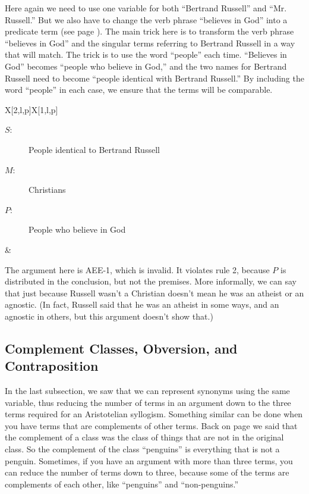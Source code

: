 Here again we need to use one variable for both ``Bertrand Russell'' and ``Mr. Russell.'' But we also have to change the verb phrase ``believes in God'' into a predicate term (see page \pageref{subsec:nonstandard_verbs}). The main trick here is to transform the verb phrase ``believes in God'' and the singular terms referring to Bertrand Russell in a way that will match. The trick is to use the word ``people'' each time. ``Believes in God'' becomes ``people who believe in God,'' and the two names for Bertrand Russell need to become ``people identical with Bertrand Russell.'' By including the word ``people'' in each case, we ensure that the terms will be comparable.

\begin{tabu}{{X[2,l,p]X[1,l,p]}}
\begin{description}
\item[$S$:] People identical to Bertrand Russell
\item[$M$:] Christians
\item[$P$:] People who believe in God
\end{description}
&
\begin{kormanize}
\end{kormanize}
\end{tabu}

The argument here is AEE-1, which is invalid. It violates rule 2, because $P$ is distributed in the conclusion, but not the premises. More informally, we can say that just because Russell wasn't a Christian doesn't mean he was an atheist or an agnostic. (In fact, Russell said that he was an atheist in some ways, and an agnostic in others, but this argument doesn't show that.)

\subsection{Complement Classes, Obversion, and Contraposition}

In the last subsection, we saw that we can represent synonyms using the same variable, thus reducing the number of terms in an argument down to the three terms required for an Aristotelian syllogism. Something similar can be done when you have terms that are complements of other terms. Back on page \pageref{def:Complement} we said that the complement of a class was the class of things that are not in the original class. So the complement of the class ``penguins'' is everything that is not a penguin. Sometimes, if you have an argument with more than three terms, you can reduce the number of terms down to three, because some of the terms are complements of each other, like ``penguins'' and ``non-penguins.''


